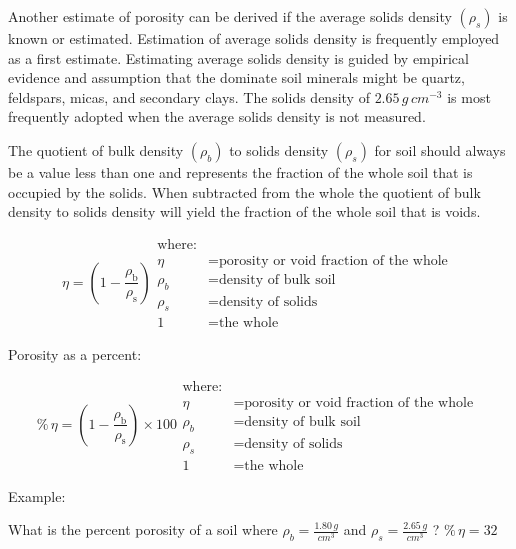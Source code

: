 \documentclass[a5paper]{book}
\begin{document}
Another estimate of porosity can be derived if the average solids density $\left(\rho_s\right)$ is known or estimated. Estimation of average solids density is frequently employed as a first estimate. Estimating average solids density is guided by empirical evidence and assumption that the dominate soil minerals might be quartz, feldspars, micas, and secondary clays. The solids density of $2.65\,g\,cm^{-3}$ is most frequently adopted when the average solids density is not measured.

The quotient of bulk density $\left(\rho_b\right)$ to solids density $\left(\rho_s\right)$ for soil should always be a value less than one and represents the fraction of the whole soil that is occupied by the solids. When subtracted from the whole the quotient of bulk density to solids density will yield the fraction of the whole soil that is voids.

\begin{equation}
    \eta =\left(1-\frac{\rho_{\text{b}}}{\rho_{\text{s}}}\right)
    \begin{aligned}
        \text{where:}\\
        \eta &= \text{porosity or void fraction of the whole }\\
        \rho_b &= \text{density of bulk soil}\\
        \rho_s &= \text{density of solids}\\
        1 &= \text{the whole}
    \end{aligned}
\end{equation}

Porosity as a percent:

\begin{equation}
    \%\,\eta =\left(1-\frac{\rho_{\text{b}}}{\rho_{\text{s}}}\right) \times 100
    \begin{aligned}
        \text{where:}\\
        \eta &= \text{porosity or void fraction of the whole }\\
        \rho_b &= \text{density of bulk soil}\\
        \rho_s &= \text{density of solids}\\
        1 &= \text{the whole}
    \end{aligned}
\end{equation}

Example:

What is the percent porosity of a soil where $\rho_b = \frac{1.80\,g}{cm^3}$ and $\rho_s = \frac{2.65\,g}{cm^3}$ ? $\%\,\eta = 32$
\end{document}

